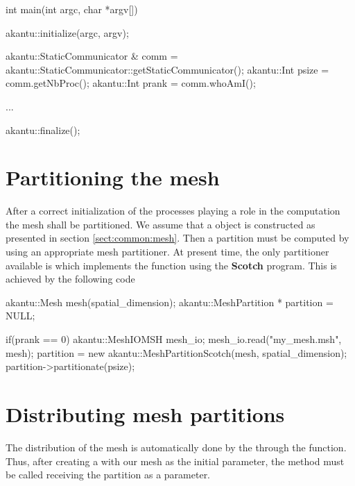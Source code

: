 \begin{cpp}
int main(int argc, char *argv[])
{
  akantu::initialize(argc, argv);

  akantu::StaticCommunicator & comm =
  akantu::StaticCommunicator::getStaticCommunicator();
  akantu::Int psize = comm.getNbProc();
  akantu::Int prank = comm.whoAmI();

  ...

  akantu::finalize();
}
\end{cpp}

\section{Partitioning the mesh}

After a correct initialization of the processes playing a role in the
computation the mesh shall be partitioned. We assume that a  object
is constructed as presented in section \ref{sect:common:mesh}.  Then a partition
must be computed by using an appropriate mesh partitioner. At present time, the
only partitioner available is  which implements the
function  using the \textbf{Scotch}\cite{scotch} program.
This is achieved by the following code

\begin{cpp}
  akantu::Mesh mesh(spatial_dimension);
  akantu::MeshPartition * partition = NULL;

  if(prank == 0) {
    akantu::MeshIOMSH mesh_io;
    mesh_io.read("my_mesh.msh", mesh);
    partition = new akantu::MeshPartitionScotch(mesh, spatial_dimension);
    partition->partitionate(psize);
  }
\end{cpp}


\section{Distributing mesh partitions}

The distribution of the mesh is automatically done by the
 through the  function.  Thus,
after creating a  with our mesh as the initial
parameter, the  method must be called receiving the partition
as a parameter.

